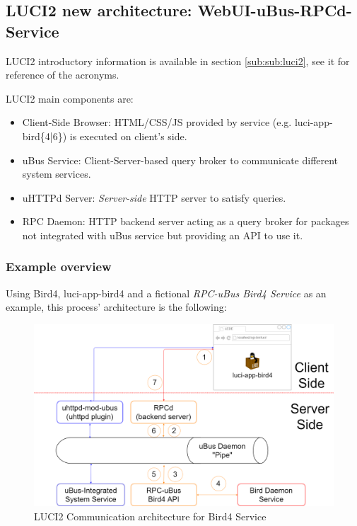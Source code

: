 \subsection{LUCI2 new architecture: WebUI-uBus-RPCd-Service}
\label{sub:luci2arch}
LUCI2 introductory information is available in section \ref{sub:sub:luci2}, see it for reference of the acronyms.

LUCI2 main components are: 

\begin{itemize}
    \item Client-Side Browser: HTML/CSS/JS provided by service (e.g. luci-app-bird\{4|6\}) is executed on client's side.
    \item uBus Service: Client-Server-based query broker to communicate different system services.
    \item uHTTPd Server: \textit{Server-side} HTTP server to satisfy queries.
    \item RPC Daemon: HTTP backend server acting as a query broker for packages not integrated with uBus service but providing an API to use it.
\end{itemize}


\subsubsection{Example overview}

Using Bird4, luci-app-bird4 and a fictional \textit{RPC-uBus Bird4 Service} as an example, this process' architecture is the following:

\begin{figure}[H]
    \centering
    \includegraphics[width=\textwidth]{images/luci2/luci2d}
    \caption{LUCI2 Communication architecture for Bird4 Service}
    \label{fig:luci2arch}
\end{figure}

